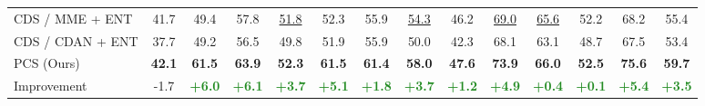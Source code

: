 \documentclass[final]{cvpr}
\newcommand{\FG}[1]{\textcolor{ForestGreen}{\textbf{#1}}}
\begin{document}
\begin{table*}[]
{\begin{threeparttable}
\begin{tabular}{l|c|c|c|c|c|c|c|c|c|c|c|c|c}
CDS / MME + ENT & 41.7 & 49.4 & 57.8 & \underline{51.8} & 52.3 & 55.9 & \underline{54.3} & 46.2 & \underline{69.0} & \underline{65.6} & 52.2 & 68.2 & 55.4 \\
CDS / CDAN + ENT & 37.7 & 49.2 & 56.5 & 49.8 & 51.9 & 55.9 & 50.0 & 42.3 & 68.1 & 63.1 & 48.7 & 67.5 & 53.4 \\
 \hline
 PCS (Ours) & \textbf{42.1} & \textbf{61.5} & \textbf{63.9} & \textbf{52.3} & \textbf{61.5} & \textbf{61.4} & \textbf{58.0} & \textbf{47.6} & \textbf{73.9} & \textbf{66.0} & \textbf{52.5} & \textbf{75.6} & \textbf{59.7} \\ 
Improvement & -1.7 & \FG{+6.0} & \FG{+6.1} & \FG{+3.7} & \FG{+5.1} & \FG{+1.8} & \FG{+3.7} & \FG{+1.2} & \FG{+4.9} & \FG{+0.4} & \FG{+0.1} & \FG{+5.4} & \FG{+3.5} \\ \hline \midrule


\end{tabular}
\end{threeparttable}}
\end{table*}
\end{document}
